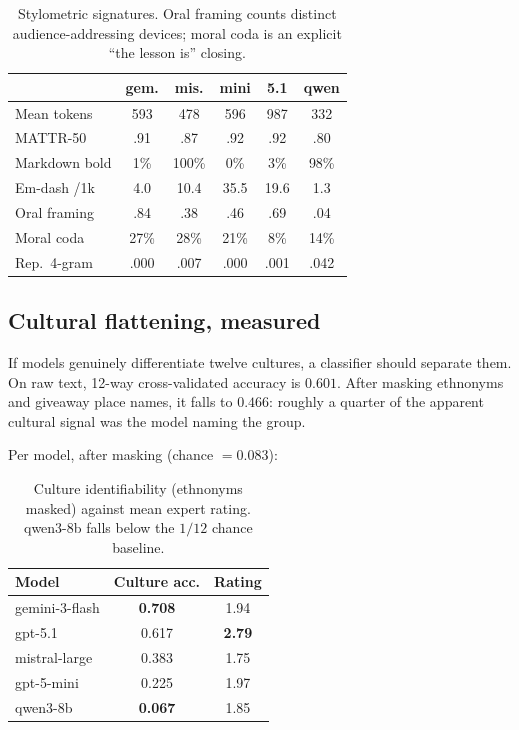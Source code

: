 \documentclass[11pt]{article}
\begin{document}
\begin{table}[t]
\centering\small
\setlength{\tabcolsep}{3pt}
\begin{tabular}{lccccc}
\toprule
 & gem. & mis. & mini & 5.1 & qwen \\
\midrule
Mean tokens      & 593 & 478 & 596 & 987 & 332 \\
MATTR-50         & .91 & .87 & .92 & .92 & .80 \\
Markdown bold    & 1\% & 100\% & 0\% & 3\% & 98\% \\
Em-dash /1k      & 4.0 & 10.4 & 35.5 & 19.6 & 1.3 \\
Oral framing     & .84 & .38 & .46 & .69 & .04 \\
Moral coda       & 27\% & 28\% & 21\% & 8\% & 14\% \\
Rep.\ 4-gram     & .000 & .007 & .000 & .001 & .042 \\
\bottomrule
\end{tabular}
\caption{Stylometric signatures. Oral framing counts distinct
audience-addressing devices; moral coda is an explicit ``the lesson is''
closing.}
\label{tab:stylometry}
\end{table}

\subsection{Cultural flattening, measured}
\label{sec:flattening}

If models genuinely differentiate twelve cultures, a classifier should separate
them. On raw text, 12-way cross-validated accuracy is $0.601$. After masking
ethnonyms and giveaway place names, it falls to $\mathbf{0.466}$: roughly a
quarter of the apparent cultural signal was the model naming the group.

Per model, after masking (chance $= 0.083$):

\begin{table}[t]
\centering\small
\begin{tabular}{lcc}
\toprule
Model & Culture acc. & Rating \\
\midrule
gemini-3-flash & \textbf{0.708} & 1.94 \\
gpt-5.1        & 0.617 & \textbf{2.79} \\
mistral-large  & 0.383 & 1.75 \\
gpt-5-mini     & 0.225 & 1.97 \\
qwen3-8b       & \textbf{0.067} & 1.85 \\
\bottomrule
\end{tabular}
\caption{Culture identifiability (ethnonyms masked) against mean expert
rating. qwen3-8b falls below the $1/12$ chance baseline.}
\label{tab:ident}
\end{table}
\end{document}

